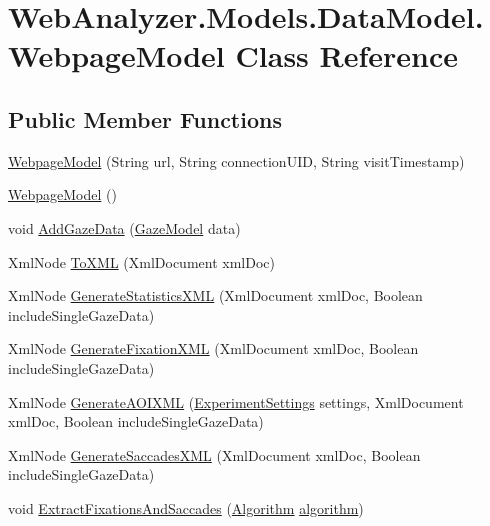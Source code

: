 \hypertarget{class_web_analyzer_1_1_models_1_1_data_model_1_1_webpage_model}{}\section{Web\+Analyzer.\+Models.\+Data\+Model.\+Webpage\+Model Class Reference}
\label{class_web_analyzer_1_1_models_1_1_data_model_1_1_webpage_model}
\subsection*{Public Member Functions}
\begin{DoxyCompactItemize}
\item 
\hyperlink{class_web_analyzer_1_1_models_1_1_data_model_1_1_webpage_model_a2f7f76f4128b22b839f8858d40413067}{Webpage\+Model} (String url, String connection\+U\+I\+D, String visit\+Timestamp)
\item 
\hyperlink{class_web_analyzer_1_1_models_1_1_data_model_1_1_webpage_model_a613cfd755d739701df6cd2b05190d72f}{Webpage\+Model} ()
\item 
void \hyperlink{class_web_analyzer_1_1_models_1_1_data_model_1_1_webpage_model_a7169078e11bdd8867dc0f507c9a65b9e}{Add\+Gaze\+Data} (\hyperlink{class_web_analyzer_1_1_models_1_1_data_model_1_1_gaze_model}{Gaze\+Model} data)
\item 
Xml\+Node \hyperlink{class_web_analyzer_1_1_models_1_1_data_model_1_1_webpage_model_a056bc9895b2a1c83631c24d100353ef2}{To\+X\+M\+L} (Xml\+Document xml\+Doc)
\item 
Xml\+Node \hyperlink{class_web_analyzer_1_1_models_1_1_data_model_1_1_webpage_model_a32f7e53626e6dcec7a2261110456dde1}{Generate\+Statistics\+X\+M\+L} (Xml\+Document xml\+Doc, Boolean include\+Single\+Gaze\+Data)
\item 
Xml\+Node \hyperlink{class_web_analyzer_1_1_models_1_1_data_model_1_1_webpage_model_a52e59f18909452181341e36e18bb57fb}{Generate\+Fixation\+X\+M\+L} (Xml\+Document xml\+Doc, Boolean include\+Single\+Gaze\+Data)
\item 
Xml\+Node \hyperlink{class_web_analyzer_1_1_models_1_1_data_model_1_1_webpage_model_ac77dcced8299e84a47feea280c9e9dee}{Generate\+A\+O\+I\+X\+M\+L} (\hyperlink{class_web_analyzer_1_1_models_1_1_settings_model_1_1_experiment_settings}{Experiment\+Settings} settings, Xml\+Document xml\+Doc, Boolean include\+Single\+Gaze\+Data)
\item 
Xml\+Node \hyperlink{class_web_analyzer_1_1_models_1_1_data_model_1_1_webpage_model_a123917bf5e44e719fb0e626615f030ab}{Generate\+Saccades\+X\+M\+L} (Xml\+Document xml\+Doc, Boolean include\+Single\+Gaze\+Data)
\item 
void \hyperlink{class_web_analyzer_1_1_models_1_1_data_model_1_1_webpage_model_aebdfec61a00dd14845ee5e46bccbf268}{Extract\+Fixations\+And\+Saccades} (\hyperlink{class_web_analyzer_1_1_models_1_1_algorithm_model_1_1_algorithm}{Algorithm} \hyperlink{_u_i_2_h_t_m_l_resources_2js_2src_2analyse_8js_a1222cf9678e9ad6a699b071d3308f976}{algorithm})
\end{DoxyCompactItemize}
